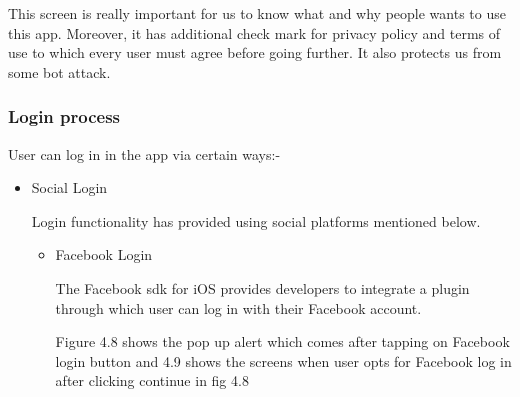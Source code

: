 \begin{itemize}
    This screen is really important for us to know what and why people wants to use this app. Moreover, it has additional check mark for privacy policy and terms of use to which every user must agree before going further. It also protects us from some bot attack.
    
    \newpage
 
\end{itemize}


\subsubsection{Login process}

User can log in in the app via certain ways:-

\begin{itemize}
    \item Social Login
    
    Login functionality has provided using social platforms mentioned below.
    
    \begin{itemize}
        \item Facebook Login
        
       The Facebook \gls{sdk} for \gls{iOS} provides developers to integrate a plugin through which user can log in with their Facebook account.
       
       Figure 4.8 shows the pop up alert which comes after tapping on Facebook login button and 4.9 shows the screens when user opts for Facebook log in after clicking continue in fig 4.8
       

\end{itemize}
\end{itemize}
